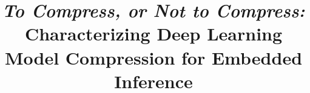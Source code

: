 \documentclass[10pt,conference]{IEEEtran}
\begin{document}
\title{\LARGE \emph{To Compress, or Not to Compress:} Characterizing Deep Learning Model Compression for Embedded Inference}

\author{
%
\vspace{-30mm}
 }

\maketitle















\balance
\end{document}
